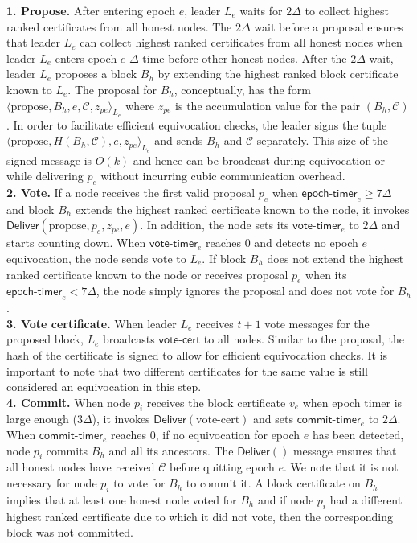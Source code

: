 \documentclass[11pt]{article}
\theoremstyle{definition}
\theoremstyle{remark}
\begin{document}
\textbf{1. Propose.} After entering epoch $e$, leader $L_e$ waits for $2 \Delta$ to collect highest ranked certificates from all honest nodes. The $2 \Delta$ wait before a proposal ensures that leader $L_e$ can collect highest ranked certificates from all honest nodes when leader $L_e$ enters epoch $e$ $\Delta$ time before other honest nodes. After the $2 \Delta$ wait, leader $L_e$ proposes a block $B_h$ by extending the highest ranked block certificate known to $L_e$. The proposal for $B_h$, conceptually, has the form $\langle \text{propose}, B_h, e, \mathcal{C}, z_{pe} \rangle_{L_e}$ where $z_{pe}$ is the accumulation value for the pair $(B_h, \mathcal{C})$. In order to facilitate efficient equivocation checks, the leader signs the tuple $\langle \text{propose}, H(B_h, \mathcal{C}), e, z_{pe} \rangle_{L_e}$ and sends $B_h$ and $\mathcal{C}$ separately. This size of the signed message is $O(k)$ and hence can be broadcast during equivocation or while delivering $p_e$ without incurring cubic communication overhead.\\

\textbf{2. Vote.} If a node receives the first valid proposal $p_e$ when $\mathsf{epoch\mbox{-}timer}_e \geq 7 \Delta$ and block $B_h$ extends the highest ranked certificate known to the node, it invokes $\mathsf{Deliver}(\text{propose}, p_e, z_{pe}, e)$. In addition, the node sets its $\mathsf{vote\mbox{-}timer}_e$ to $2 \Delta$ and starts counting down. When $\mathsf{vote\mbox{-}timer}_e$ reaches 0 and detects no epoch $e$ equivocation, the node sends vote to $L_e$. If block $B_h$ does not extend the highest ranked certificate known to the node or receives proposal $p_e$ when its $\mathsf{epoch\mbox{-}timer}_e < 7 \Delta$, the node simply ignores the proposal and does not vote for $B_h$.\\

\textbf{3. Vote certificate.} When leader $L_e$ receives $t + 1$ vote messages for the proposed block, $L_e$ broadcasts $\mathsf{vote\mbox{-}cert}$ to all nodes. Similar to the proposal, the hash of the certificate is signed to allow for efficient equivocation checks. It is important to note that two different certificates for the same value is still considered an equivocation in this step.\\

\textbf{4. Commit.} When node $p_i$ receives the block certificate $v_e$ when epoch timer is large enough ($3 \Delta$), it invokes $\mathsf{Deliver}(\text{vote-cert})$ and sets $\mathsf{commit\mbox{-}timer}_e$ to $2 \Delta$. When $\mathsf{commit\mbox{-}timer}_e$ reaches 0, if no equivocation for epoch $e$ has been detected, node $p_i$ commits $B_h$ and all its ancestors. The $\mathsf{Deliver}()$ message ensures that all honest nodes have received $\mathcal{C}$ before quitting epoch $e$. We note that it is not necessary for node $p_i$ to vote for $B_h$ to commit it. A block certificate on $B_h$ implies that at least one honest node voted for $B_h$ and if node $p_i$ had a different highest ranked certificate due to which it did not vote, then the corresponding block was not committed.\\
\end{document}
